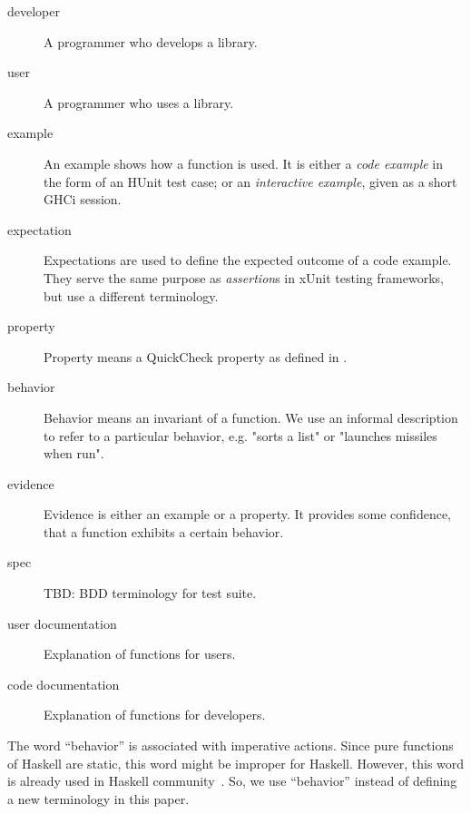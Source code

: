 \documentclass[preprint]{sigplanconf}
\begin{document}
\begin{description}

\item[developer]
    A programmer who develops a library.

\item[user]
    A programmer who uses a library.

\item[example]
    An example shows how a function is used.  It is either a \emph{code
    example} in the form of an HUnit test case; or an \emph{interactive
    example}, given as a short GHCi session.

\item[expectation]
    Expectations are used to define the expected outcome of a code
    example.  They serve the same purpose as \emph{assertion}\/s in xUnit
    testing frameworks, but use a different terminology.

\item[property]
    Property means a QuickCheck property as defined in
    \cite{quickcheck}.

\item[behavior]
    Behavior means an invariant of a function.  We use an informal description
    to refer to a particular behavior, e.g.  "sorts a list" or "launches
    missiles when run".

\item[evidence]
    Evidence is either an example or a property.  It provides some confidence,
    that a function exhibits a certain behavior.

\item[spec]
    TBD: BDD terminology for test suite.

\item[user documentation]
    Explanation of functions for users.
\item[code documentation]
    Explanation of functions for developers.

\end{description}

The word ``behavior'' is associated with imperative actions.
Since pure functions of Haskell are static,
this word might be improper for Haskell.
However, this word is already used in Haskell community~\cite{typeclassopedia}.
So, we use ``behavior'' instead of defining a new terminology in this paper.

\end{document}
